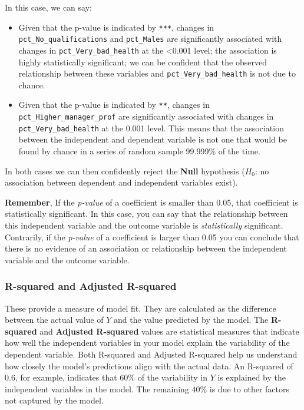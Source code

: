 \documentclass[
  letterpaper,
  DIV=11,
  numbers=noendperiod]{scrreprt}
\providecommand{\tightlist}{%
  \setlength{\itemsep}{0pt}\setlength{\parskip}{0pt}}\usepackage{longtable,booktabs,array}
\begin{document}
In this case, we can say:

\begin{itemize}
\tightlist
\item
  Given that the p-value is indicated by \texttt{***}, changes in
  \texttt{pct\_No\_qualifications} and \texttt{pct\_Males} are
  significantly associated with changes in
  \texttt{pct\_Very\_bad\_health} at the \textless0.001 level; the
  association is highly statistically significant; we can be confident
  that the observed relationship between these variables and
  \texttt{pct\_Very\_bad\_health} is not due to chance.
\item
  Given that the p-value is indicated by \texttt{**}, changes in
  \texttt{pct\_Higher\_manager\_prof} are significantly associated with
  changes in \texttt{pct\_Very\_bad\_health} at the 0.001 level. This
  means that the association between the independent and dependent
  variable is not one that would be found by chance in a series of
  random sample 99.999\% of the time.
\end{itemize}

In both cases we can then confidently reject the \textbf{Null}
hypothesis (\(H_0\): no association between dependent and independent
variables exist).

\textbf{Remember}, If the \emph{p-value} of a coefficient is smaller
than 0.05, that coefficient is statistically significant. In this case,
you can say that the relationship between this independent variable and
the outcome variable is \emph{statistically} significant. Contrarily, if
the \emph{p-value} of a coefficient is larger than 0.05 you can conclude
that there is no evidence of an association or relationship between the
independent variable and the outcome variable.

\subsubsection{R-squared and Adjusted
R-squared}\label{r-squared-and-adjusted-r-squared}

These provide a measure of model fit. They are calculated as the
difference between the actual value of \(Y\) and the value predicted by
the model. The \textbf{R-squared} and \textbf{Adjusted R-squared} values
are statistical measures that indicate how well the independent
variables in your model explain the variability of the dependent
variable. Both R-squared and Adjusted R-squared help us understand how
closely the model's predictions align with the actual data. An R-squared
of 0.6, for example, indicates that 60\% of the variability in \(Y\) is
explained by the independent variables in the model. The remaining 40\%
is due to other factors not captured by the model.
\end{document}
